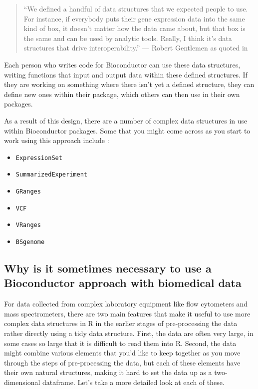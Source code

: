 \documentclass[]{tufte-book}
\providecommand{\tightlist}{%
  \setlength{\itemsep}{0pt}\setlength{\parskip}{0pt}}
\begin{document}
\begin{quote}
``We defined a handful of data structures that we expected people to use. For
instance, if everybody puts their gene expression data into the same kind of
box, it doesn't matter how the data came about, but that box is the same and can
be used by analytic tools. Really, I think it's data structures that drive
interoperability.'' --- Robert Gentlemen as quoted in \citet{altschul2013anatomy}
\end{quote}

Each person who writes code for Bioconductor can use these data structures,
writing functions that input and output data within these defined structures. If
they are working on something where there isn't yet a defined structure, they
can define new ones within their package, which others can then use in their own
packages.

As a result of this design, there are a number of complex data structures in
use within Bioconductor packages. Some that you might come across as you start to work
using this approach include \citep{huber2015orchestrating}:

\begin{itemize}
\tightlist
\item
  \texttt{ExpressionSet}
\item
  \texttt{SummarizedExperiment}
\item
  \texttt{GRanges}
\item
  \texttt{VCF}
\item
  \texttt{VRanges}
\item
  \texttt{BSgenome}
\end{itemize}

\subsection{Why is it sometimes necessary to use a Bioconductor approach with biomedical data}\label{why-is-it-sometimes-necessary-to-use-a-bioconductor-approach-with-biomedical-data}

For data collected from complex laboratory equipment like flow cytometers and
mass spectrometers, there are two main features that make it useful to use more
complex data structures in R in the earlier stages of pre-processing the data
rather directly using a tidy data structure. First, the data are often very
large, in some cases so large that it is difficult to read them into R. Second,
the data might combine various elements that you'd like to keep together as you
move through the steps of pre-processing the data, but each of these elements
have their own natural structures, making it hard to set the data up as a
two-dimensional dataframe. Let's take a more detailed look at each of these.
\end{document}
